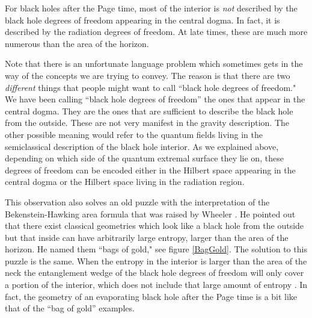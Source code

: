  For black holes after the Page time,  most of the interior is {\it not} described by the black hole degrees of freedom appearing in the central dogma. In fact, it is described by the radiation degrees of freedom. At late times, these are much more numerous than the area of the horizon. 
	
	 
	Note that there is an unfortunate language problem which sometimes gets in the way of the concepts we are trying to convey. The reason is that there are two {\it different} things that people might want to call ``black hole degrees of freedom." We have been calling ``black hole degrees of freedom'' the ones that appear in the central dogma. They are the ones that are sufficient to describe the black hole from the outside. These are not very manifest in the gravity description. The other possible meaning would refer to the quantum fields living in the semiclassical description of the black hole interior. As we explained above, depending on which side of the quantum extremal surface they lie on, these degrees of freedom can be encoded  either  in the Hilbert space  appearing in the central dogma or the Hilbert space living in the radiation region.   	
	
	 
	  This observation also solves an old puzzle with the interpretation of the  Bekenstein-Hawking   area formula that was raised by Wheeler \cite{WheelerBag}. 
 He pointed out that there exist classical geometries which look like a black hole from the outside but that inside can have arbitrarily large entropy, larger than the area of the horizon. He named them ``bags of gold," see figure \ref{BagGold}. The solution to this puzzle is the same. When the entropy in the interior is larger than the area of the neck  the entanglement wedge of the black hole degrees of freedom will only cover a portion of the interior, which does not include that large amount of entropy \cite{WallGold}.   In fact, the geometry of an evaporating black hole after the Page time is a bit like that of the ``bag of gold'' examples. 
 
